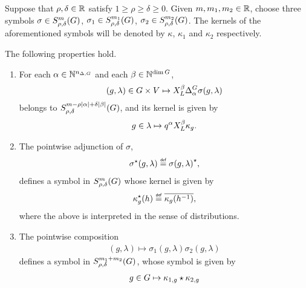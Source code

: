 \begin{proposition}
    Suppose that $\rho, \delta \in \mathbb{R}$ satisfy $1 \geq \rho \geq \delta \geq 0$.
    Given $m, m_1, m_2 \in \mathbb{R}$,
    choose three symbols $\sigma \in S^{m}_{\rho, \delta}(G)$,
    $\sigma_1 \in S^{m_1}_{\rho, \delta}(G)$,
    $\sigma_2 \in S^{m_2}_{\rho, \delta}(G)$.
    The kernels of the aforementioned symbols will be denoted by
    $\kappa$, $\kappa_1$ and $\kappa_2$ respectively.

    The following properties hold.
    \begin{enumerate}
        \item For each $\alpha \in \mathbb{N}^{{n_{\Delta, G}}}$ and each $\beta \in \mathbb{N}^{\dim G}$,
            \begin{align*}
                (g, \lambda) \in \Group \times \VectorSpace \mapsto
                \LeftDifferentialOperator \beta \DifferenceOperator \alpha \sigma(g, \lambda)
            \end{align*}
            belongs to $S^{m - \rho \left|{\alpha}\right| + \delta \left|{\beta}\right|}_{\rho, \delta}(G)$,
            and its kernel is given by
            \begin{align*}
                g \in \lambda \mapsto q^\alpha \LeftDifferentialOperator \beta \kappa_g.
            \end{align*}
        \item The pointwise adjunction of $\sigma$,
            \begin{align*}
                \adj \sigma(g, \lambda) \defeq \adj {\sigma(g, \lambda)},
            \end{align*}
            defines a symbol in $S^{m}_{\rho, \delta}(G)$ whose kernel is given by
            \begin{align*}
                \adj \kappa_g(h) \defeq \conj {\kappa_g(h^{-1})},
            \end{align*}
            where the above is interpreted in the sense of distributions.
        \item The pointwise composition
            \begin{align*}
                (g, \lambda) \mapsto \sigma_1(g, \lambda) \sigma_2(g, \lambda)
            \end{align*}
            defines a symbol in $S^{m_1 + m_2}_{\rho, \delta}(G)$,
            whose symbol is given by
            \begin{align*}
                g \in G \mapsto \kappa_{1, g} \star \kappa_{2, g}
            \end{align*}
    \end{enumerate}
\end{proposition}

